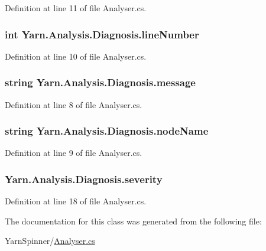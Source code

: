 Definition at line 11 of file Analyser.\-cs.

\hypertarget{a00081_a0bd73f1c684bfd66ae7b6bef8f2972d0}{
\subsubsection[{line\-Number}]{\setlength{\rightskip}{0pt plus 5cm}int Yarn.\-Analysis.\-Diagnosis.\-line\-Number}}\label{a00081_a0bd73f1c684bfd66ae7b6bef8f2972d0}


Definition at line 10 of file Analyser.\-cs.

\hypertarget{a00081_ac7ed070dddd2613c08e7874ea5afb3af}{
\subsubsection[{message}]{\setlength{\rightskip}{0pt plus 5cm}string Yarn.\-Analysis.\-Diagnosis.\-message}}\label{a00081_ac7ed070dddd2613c08e7874ea5afb3af}


Definition at line 8 of file Analyser.\-cs.

\hypertarget{a00081_a662aca4ad2af5116c2cf6773daf1a847}{
\subsubsection[{node\-Name}]{\setlength{\rightskip}{0pt plus 5cm}string Yarn.\-Analysis.\-Diagnosis.\-node\-Name}}\label{a00081_a662aca4ad2af5116c2cf6773daf1a847}


Definition at line 9 of file Analyser.\-cs.

\hypertarget{a00081_ad90ffa839ce0f568a099bb37b4a6c4da}{
\subsubsection[{severity}]{ Yarn.\-Analysis.\-Diagnosis.\-severity}}\label{a00081_ad90ffa839ce0f568a099bb37b4a6c4da}


Definition at line 18 of file Analyser.\-cs.



The documentation for this class was generated from the following file\-:\begin{DoxyCompactItemize}
\item 
Yarn\-Spinner/\hyperlink{a00287}{Analyser.\-cs}\end{DoxyCompactItemize}
